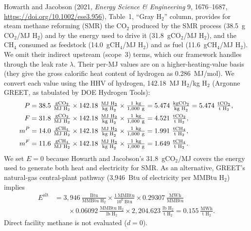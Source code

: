 \documentclass[11pt]{article}
\newcommand{\cotwo}{\ensuremath{\mathrm{CO_2}}}
\newcommand{\chfour}{\ensuremath{\mathrm{CH_4}}}
\begin{document}
Howarth and Jacobson (2021, \textit{Energy Science \& Engineering} 9, 1676--1687, \url{https://doi.org/10.1002/ese3.956}), Table~1, ``Gray H$_2$'' column, provides for steam methane reforming (SMR) the \cotwo{} produced by the SMR process (38.5~g\cotwo{}/MJ H$_2$) and by the energy used to drive it (31.8~g\cotwo{}/MJ H$_2$), and the \chfour{} consumed as feedstock (14.0~g\chfour{}/MJ H$_2$) and as fuel (11.6~g\chfour{}/MJ H$_2$). We omit their indirect upstream (scope~3) terms, which our framework handles through the leak rate $\lambda$. Their per-MJ values are on a higher-heating-value basis (they give the gross calorific heat content of hydrogen as 0.286~MJ/mol). We convert each value using the HHV of hydrogen, 142.18~MJ H$_2$/kg H$_2$ (Argonne GREET, as tabulated by DOE Hydrogen Tools):
%
\begin{align*}
  P &= 38.5~\tfrac{\text{g\cotwo{}}}{\text{MJ H}_2} \times 142.18~\tfrac{\text{MJ H}_2}{\text{kg H}_2} \times \tfrac{1~\text{kg}}{1{,}000~\text{g}} = 5.474~\tfrac{\text{kg\cotwo{}}}{\text{kg H}_2} = 5.474~\tfrac{\text{t\cotwo{}}}{\text{t H}_2}, \\
  F &= 31.8~\tfrac{\text{g\cotwo{}}}{\text{MJ H}_2} \times 142.18~\tfrac{\text{MJ H}_2}{\text{kg H}_2} \times \tfrac{1~\text{kg}}{1{,}000~\text{g}} = 4.521~\tfrac{\text{t\cotwo{}}}{\text{t H}_2}, \\
  m^P &= 14.0~\tfrac{\text{g\chfour{}}}{\text{MJ H}_2} \times 142.18~\tfrac{\text{MJ H}_2}{\text{kg H}_2} \times \tfrac{1~\text{kg}}{1{,}000~\text{g}} = 1.991~\tfrac{\text{t\chfour{}}}{\text{t H}_2}, \\
  m^F &= 11.6~\tfrac{\text{g\chfour{}}}{\text{MJ H}_2} \times 142.18~\tfrac{\text{MJ H}_2}{\text{kg H}_2} \times \tfrac{1~\text{kg}}{1{,}000~\text{g}} = 1.649~\tfrac{\text{t\chfour{}}}{\text{t H}_2}.
\end{align*}
%
We set $E = 0$ because Howarth and Jacobson's 31.8~g\cotwo{}/MJ covers the energy used to generate both heat and electricity for SMR. As an alternative, GREET's natural-gas central-plant pathway (3{,}946~Btu of electricity per MMBtu H$_2$) implies
%
\begin{align*}
  E^{\text{alt}} &= 3{,}946~\tfrac{\text{Btu}}{\text{MMBtu H}_2} \times \tfrac{1~\text{MMBtu}}{10^{6}~\text{Btu}} \times 0.29307~\tfrac{\text{MWh}}{\text{MMBtu}} \\
  &\qquad \times 0.06092~\tfrac{\text{MMBtu H}_2}{\text{lb H}_2} \times 2{,}204.623~\tfrac{\text{lb H}_2}{\text{t H}_2} = 0.155~\tfrac{\text{MWh}}{\text{t H}_2}.
\end{align*}
%
Direct facility methane is not evaluated ($d = 0$).
\end{document}
